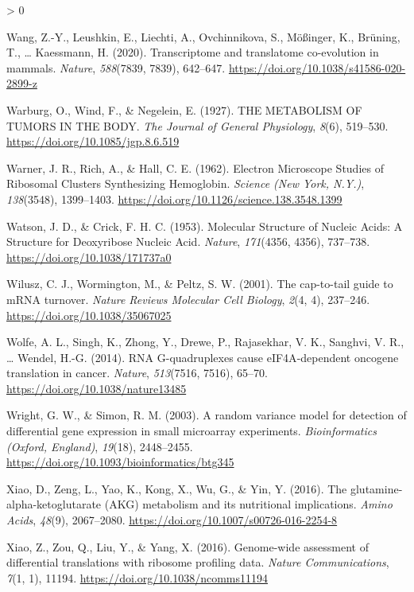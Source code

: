 \documentclass[
  12pt,
  openany]{book}
\newlength{\cslhangindent}
\newenvironment{CSLReferences}[2] %
 {%
  \setlength{\parindent}{0pt}
  \ifodd #1 \everypar{\setlength{\hangindent}{\cslhangindent}}\ignorespaces\fi
  \ifnum #2 > 0
  \setlength{\parskip}{#2\baselineskip}
  \fi
 }%
 {}
\begin{document}
\begin{CSLReferences}{1}{0}
\leavevmode\hypertarget{ref-Wang2020}{}%
Wang, Z.-Y., Leushkin, E., Liechti, A., Ovchinnikova, S., Mößinger, K., Brüning, T., \ldots{} Kaessmann, H. (2020). Transcriptome and translatome co-evolution in mammals. \emph{Nature}, \emph{588}(7839, 7839), 642--647. \url{https://doi.org/10.1038/s41586-020-2899-z}

\leavevmode\hypertarget{ref-Warburg1927}{}%
Warburg, O., Wind, F., \& Negelein, E. (1927). {THE METABOLISM OF TUMORS IN THE BODY}. \emph{The Journal of General Physiology}, \emph{8}(6), 519--530. \url{https://doi.org/10.1085/jgp.8.6.519}

\leavevmode\hypertarget{ref-Warner1962}{}%
Warner, J. R., Rich, A., \& Hall, C. E. (1962). Electron {Microscope Studies} of {Ribosomal Clusters Synthesizing Hemoglobin}. \emph{Science (New York, N.Y.)}, \emph{138}(3548), 1399--1403. \url{https://doi.org/10.1126/science.138.3548.1399}

\leavevmode\hypertarget{ref-Watson1953}{}%
Watson, J. D., \& Crick, F. H. C. (1953). Molecular {Structure} of {Nucleic Acids}: {A Structure} for {Deoxyribose Nucleic Acid}. \emph{Nature}, \emph{171}(4356, 4356), 737--738. \url{https://doi.org/10.1038/171737a0}

\leavevmode\hypertarget{ref-Wilusz2001}{}%
Wilusz, C. J., Wormington, M., \& Peltz, S. W. (2001). The cap-to-tail guide to {mRNA} turnover. \emph{Nature Reviews Molecular Cell Biology}, \emph{2}(4, 4), 237--246. \url{https://doi.org/10.1038/35067025}

\leavevmode\hypertarget{ref-Wolfe2014}{}%
Wolfe, A. L., Singh, K., Zhong, Y., Drewe, P., Rajasekhar, V. K., Sanghvi, V. R., \ldots{} Wendel, H.-G. (2014). {RNA G}-quadruplexes cause {eIF4A}-dependent oncogene translation in cancer. \emph{Nature}, \emph{513}(7516, 7516), 65--70. \url{https://doi.org/10.1038/nature13485}

\leavevmode\hypertarget{ref-Wright2003}{}%
Wright, G. W., \& Simon, R. M. (2003). A random variance model for detection of differential gene expression in small microarray experiments. \emph{Bioinformatics (Oxford, England)}, \emph{19}(18), 2448--2455. \url{https://doi.org/10.1093/bioinformatics/btg345}

\leavevmode\hypertarget{ref-Xiao2016}{}%
Xiao, D., Zeng, L., Yao, K., Kong, X., Wu, G., \& Yin, Y. (2016). The glutamine-alpha-ketoglutarate ({AKG}) metabolism and its nutritional implications. \emph{Amino Acids}, \emph{48}(9), 2067--2080. \url{https://doi.org/10.1007/s00726-016-2254-8}

\leavevmode\hypertarget{ref-Xiao2016a}{}%
Xiao, Z., Zou, Q., Liu, Y., \& Yang, X. (2016). Genome-wide assessment of differential translations with ribosome profiling data. \emph{Nature Communications}, \emph{7}(1, 1), 11194. \url{https://doi.org/10.1038/ncomms11194}


\end{CSLReferences}
\end{document}

